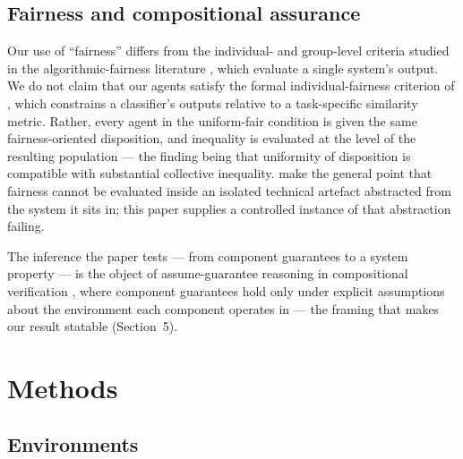 \documentclass[11pt,a4paper]{article}
\begin{document}
\subsection{Fairness and compositional assurance}

Our use of ``fairness'' differs from the individual- and group-level
criteria studied in the algorithmic-fairness literature
\citep{Dwork:2012:Fairness}, which evaluate a single system's output. We do not
claim that our agents satisfy the formal individual-fairness criterion
of \citet{Dwork:2012:Fairness}, which constrains a classifier's outputs relative
to a task-specific similarity metric. Rather, every agent in the
uniform-fair condition is given the same fairness-oriented
disposition, and inequality is evaluated at the level of the resulting
population --- the finding being that uniformity of disposition is
compatible with substantial collective inequality.
\citet{Selbst:2019:Abstraction} make the
general point that fairness cannot be evaluated inside an isolated
technical artefact abstracted from the system it sits in; this paper
supplies a controlled instance of that abstraction failing.

The inference the paper tests --- from component guarantees to a
system property --- is the object of assume-guarantee reasoning in
compositional verification \citep{Henzinger:1998:Assume}, where component
guarantees hold only under explicit assumptions about the environment
each component operates in --- the framing that makes our result
statable (Section~5).


\section{Methods}

\subsection{Environments}
\end{document}
